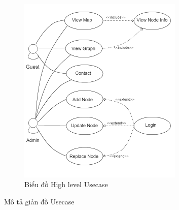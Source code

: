 \begin{center}
\begin{figure}[htp]
\centering    
\includegraphics[width=0.7\textwidth]{usecase_diagram}
\caption[Biểu đồ High level Usecase]{Biểu đồ High level Usecase }
\label{fig:usecase_diagram}
\end{figure}
\end{center}

Mô tả giản đồ Usecase

